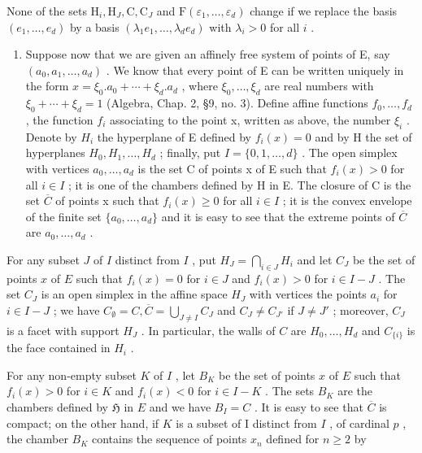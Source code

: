 None of the sets \(\mathrm{H}_i, \mathrm{H}_J, \mathrm{C}, \mathrm{C}_J\) and \(\mathrm{F}(\varepsilon_1, \ldots, \varepsilon_d)\) change if we replace the basis \((e_1, \ldots, e_d)\) by a basis \((\lambda_1 e_1, \ldots, \lambda_d e_d)\) with \(\lambda_i > 0\) for all \(i\) .

\begin{enumerate}
\def\labelenumi{\alph{enumi})}
\setcounter{enumi}{1}
\tightlist
\item
  Suppose now that we are given an affinely free system of points of E, say \((a_{0}, a_{1}, \ldots, a_{d})\) . We know that every point of E can be written uniquely in the form \(x = \xi_{0}.a_{0} + \cdots + \xi_{d}.a_{d}\) , where \(\xi_{0}, \ldots, \xi_{d}\) are real numbers with \(\xi_{0} + \cdots + \xi_{d} = 1\) (Algebra, Chap. 2, §9, no. 3). Define affine functions \(f_{0}, \ldots, f_{d}\) , the function \(f_{i}\) associating to the point x, written as above, the number \(\xi_{i}\) . Denote by \(H_{i}\) the hyperplane of E defined by \(f_{i}(x) = 0\) and by H the set of hyperplanes \(H_{0}, H_{1}, \ldots, H_{d}\) ; finally, put \(I = \{0, 1, \ldots, d\}\) . The open simplex with vertices \(a_{0}, \ldots, a_{d}\) is the set C of points x of E such that \(f_{i}(x) > 0\) for all \(i \in I\) ; it is one of the chambers defined by H in E. The closure of C is the set \(\overline{C}\) of points x such that \(f_{i}(x) \geqslant 0\) for all \(i \in I\) ; it is the convex envelope of the finite set \(\{a_{0}, \ldots, a_{d}\}\) and it is easy to see that the extreme points of \(\overline{C}\) are \(a_{0}, \ldots, a_{d}\) .
\end{enumerate}

For any subset \(J\) of \(I\) distinct from \(I\) , put \(H_J = \bigcap_{i \in J} H_i\) and let \(C_J\) be the set of points \(x\) of \(E\) such that \(f_i(x) = 0\) for \(i \in J\) and \(f_i(x) > 0\) for \(i \in I - J\) . The set \(C_J\) is an open simplex in the affine space \(H_J\) with vertices the points \(a_i\) for \(i \in I - J\) ; we have \(C_\emptyset = C, \overline{C} = \bigcup_{J \neq I} C_J\) and \(C_J \neq C_{J'}\) if \(J \neq J'\) ; moreover, \(C_J\) is a facet with support \(H_J\) . In particular, the walls of \(C\) are \(H_0, \ldots, H_d\) and \(C_{\{i\}}\) is the face contained in \(H_i\) .

For any non-empty subset \(K\) of \(I\) , let \(B_K\) be the set of points \(x\) of \(E\) such that \(f_i(x) > 0\) for \(i \in K\) and \(f_i(x) < 0\) for \(i \in I - K\) . The sets \(B_K\) are the chambers defined by \(\mathfrak{H}\) in \(E\) and we have \(B_I = C\) . It is easy to see that \(\overline{C}\) is compact; on the other hand, if \(K\) is a subset of I distinct from \(I\) , of cardinal \(p\) , the chamber \(B_K\) contains the sequence of points \(x_n\) defined for \(n \geqslant 2\) by

